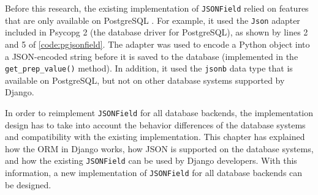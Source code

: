 Before this research, the existing implementation of \verb|JSONField| relied on
features that are only available on PostgreSQL \cite{django:pgjsonfield}. For
example, it used the \verb|Json| adapter included in Psycopg 2 (the database
driver for PostgreSQL), as shown by lines 2 and 5 of
\autoref{code:pgjsonfield}. The adapter was used to encode a Python object into
a JSON-encoded string before it is saved to the database (implemented in the
\verb|get_prep_value()| method). In addition, it used the \verb|jsonb| data
type that is available on PostgreSQL, but not on other database systems
supported by Django.

In order to reimplement \verb|JSONField| for all database backends, the
implementation design has to take into account the behavior differences of the
database systems and compatibility with the existing implementation.
This chapter has explained how the ORM in Django works, how JSON is supported
on the database systems, and how the existing \verb|JSONField| can be used by
Django developers. With this information, a new implementation of
\verb|JSONField| for all database backends can be designed.
